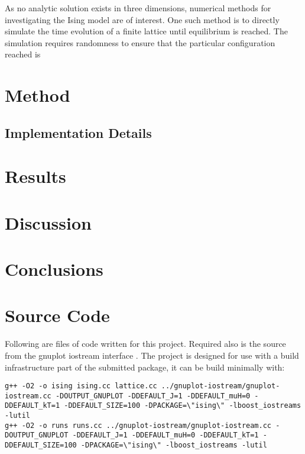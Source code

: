 \documentclass[12pt,a4paper,english]{article}
\begin{document}
As no analytic solution exists in three dimensions, numerical methods for investigating the Ising model are of interest.  One such method is to directly simulate the time evolution of a finite lattice until equilibrium is reached.  The simulation requires randomness to ensure that the particular configuration reached is 

\section{Method}
\label{sec:method}

\subsection{Implementation Details}
\label{sec:implementation-details}

\section{Results}
\label{sec:results}

\section{Discussion}
\label{sec:discussion}

\section{Conclusions}
\label{sec:conclusions}




\appendix

\section{Source Code}

Following are files of code written for this project. Required also is the source from the gnuplot iostream interface \cite{gnuplot-iostream}.  The project is designed for use with a build infrastructure part of the submitted package, it can be build minimally with:
\begin{lstlisting}
g++ -O2 -o ising ising.cc lattice.cc ../gnuplot-iostream/gnuplot-iostream.cc -DOUTPUT_GNUPLOT -DDEFAULT_J=1 -DDEFAULT_muH=0 -DDEFAULT_kT=1 -DDEFAULT_SIZE=100 -DPACKAGE=\"ising\" -lboost_iostreams -lutil
g++ -O2 -o runs runs.cc ../gnuplot-iostream/gnuplot-iostream.cc -DOUTPUT_GNUPLOT -DDEFAULT_J=1 -DDEFAULT_muH=0 -DDEFAULT_kT=1 -DDEFAULT_SIZE=100 -DPACKAGE=\"ising\" -lboost_iostreams -lutil
\end{lstlisting}

\lstset{language=C++}




\end{document}
